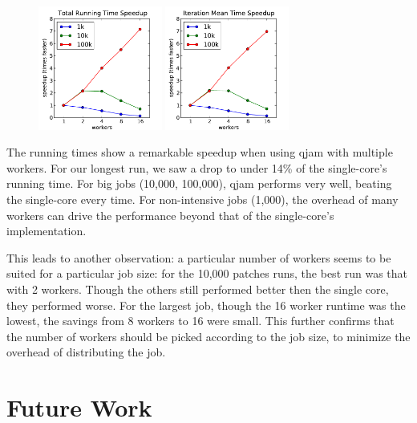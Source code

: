 \documentclass[%
  final,
  notitlepage,
  narroweqnarray,
  inline,
]{ieee}
\begin{document}
\begin{figure}[ht!]
  \centering
  \includegraphics[width=1.6in]{graphs/total_running_time_speedup.pdf}
  \includegraphics[width=1.6in]{graphs/iteration_mean_time_speedup.pdf}
  \label{graph_total_running_time_speedup}
\end{figure}




The running times show a remarkable speedup when using qjam with multiple
workers. For our longest run, we saw a drop to under 14\% of the single-core's
running time. For big jobs (10,000, 100,000), qjam performs very well, beating
the single-core every time. For non-intensive jobs (1,000), the overhead of many
workers can drive the performance beyond that of the single-core's
implementation.

This leads to another observation: a particular number of workers seems to be
suited for a particular job size: for the 10,000 patches runs, the best run was
that with 2 workers. Though the others still performed better then the single
core, they performed worse. For the largest job, though the 16 worker runtime
was the lowest, the savings from 8 workers to 16 were small. This further
confirms that the number of workers should be picked according to the job size,
to minimize the overhead of distributing the job.

\section{Future Work}
\end{document}
